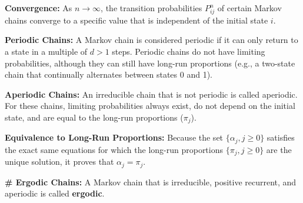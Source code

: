 \textbf{Convergence:} As $n \to \infty$, the transition probabilities $P_{ij}^n$ of certain Markov chains converge to a specific value that is independent of the initial state $i$.

\textbf{Periodic Chains:} A Markov chain is considered periodic if it can only return to a state in a multiple of $d > 1$ steps. Periodic chains do not have limiting probabilities, although they can still have long-run proportions (e.g., a two-state chain that continually alternates between states 0 and 1).

\textbf{Aperiodic Chains:} An irreducible chain that is not periodic is called aperiodic. For these chains, limiting probabilities always exist, do not depend on the initial state, and are equal to the long-run proportions ($\pi_j$).

\textbf{Equivalence to Long-Run Proportions:} Because the set $\{\alpha_j, j \ge 0\}$ satisfies the exact same equations for which the long-run proportions $\{\pi_j, j \ge 0\}$ are the unique solution, it proves that $\alpha_j = \pi_j$.

\textbf{\textcolor{primary}{\# Ergodic Chains:}} A Markov chain that is irreducible, positive recurrent, and aperiodic is called \textbf{ergodic}.